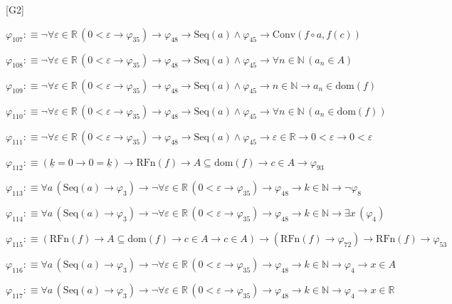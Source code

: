 \begin{fullproof}{[G2]}
\begin{abbrevlist}
\item $\varphi_{107} :\equiv \neg \forall \varepsilon \in \mathbb{R}\,(0 < \varepsilon \to \varphi_{35}) \to \varphi_{48} \to \mathrm{Seq}(a) \land \varphi_{45} \to \mathrm{Conv}(f \circ a,f(c))$
\item $\varphi_{108} :\equiv \neg \forall \varepsilon \in \mathbb{R}\,(0 < \varepsilon \to \varphi_{35}) \to \varphi_{48} \to \mathrm{Seq}(a) \land \varphi_{45} \to \forall n \in \mathbb{N}\,(a_{n} \in A)$
\item $\varphi_{109} :\equiv \neg \forall \varepsilon \in \mathbb{R}\,(0 < \varepsilon \to \varphi_{35}) \to \varphi_{48} \to \mathrm{Seq}(a) \land \varphi_{45} \to n \in \mathbb{N} \to a_{n} \in \mathrm{dom}(f)$
\item $\varphi_{110} :\equiv \neg \forall \varepsilon \in \mathbb{R}\,(0 < \varepsilon \to \varphi_{35}) \to \varphi_{48} \to \mathrm{Seq}(a) \land \varphi_{45} \to \forall n \in \mathbb{N}\,(a_{n} \in \mathrm{dom}(f))$
\item $\varphi_{111} :\equiv \neg \forall \varepsilon \in \mathbb{R}\,(0 < \varepsilon \to \varphi_{35}) \to \varphi_{48} \to \mathrm{Seq}(a) \land \varphi_{45} \to \varepsilon \in \mathbb{R} \to 0 < \varepsilon \to 0 < \varepsilon$
\item $\varphi_{112} :\equiv (\underline{k} = 0 \to 0 = \underline{k}) \to \mathrm{RFn}(f) \to A \subseteq \mathrm{dom}(f) \to c \in A \to \varphi_{93}$
\item $\varphi_{113} :\equiv \forall a\,(\mathrm{Seq}(a) \to \varphi_{3}) \to \neg \forall \varepsilon \in \mathbb{R}\,(0 < \varepsilon \to \varphi_{35}) \to \varphi_{48} \to k \in \mathbb{N} \to \neg \varphi_{8}$
\item $\varphi_{114} :\equiv \forall a\,(\mathrm{Seq}(a) \to \varphi_{3}) \to \neg \forall \varepsilon \in \mathbb{R}\,(0 < \varepsilon \to \varphi_{35}) \to \varphi_{48} \to k \in \mathbb{N} \to \exists x\,(\varphi_{4})$
\item $\varphi_{115} :\equiv (\mathrm{RFn}(f) \to A \subseteq \mathrm{dom}(f) \to c \in A \to c \in A) \to (\mathrm{RFn}(f) \to \varphi_{72}) \to \mathrm{RFn}(f) \to \varphi_{53}$
\item $\varphi_{116} :\equiv \forall a\,(\mathrm{Seq}(a) \to \varphi_{3}) \to \neg \forall \varepsilon \in \mathbb{R}\,(0 < \varepsilon \to \varphi_{35}) \to \varphi_{48} \to k \in \mathbb{N} \to \varphi_{4} \to x \in A$
\item $\varphi_{117} :\equiv \forall a\,(\mathrm{Seq}(a) \to \varphi_{3}) \to \neg \forall \varepsilon \in \mathbb{R}\,(0 < \varepsilon \to \varphi_{35}) \to \varphi_{48} \to k \in \mathbb{N} \to \varphi_{4} \to x \in \mathbb{R}$

\end{abbrevlist}
\end{fullproof}
